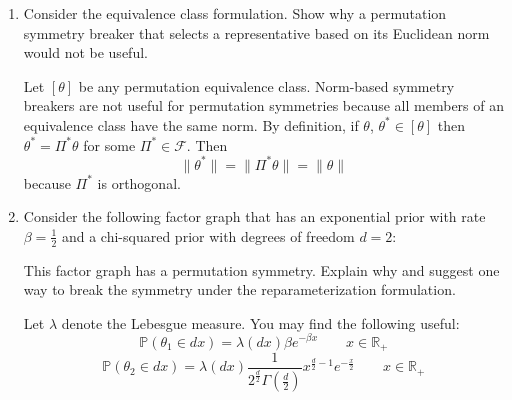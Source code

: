 \begin{enumerate}
\item
Consider the equivalence class formulation. Show why a permutation symmetry breaker that selects a representative based on its Euclidean norm would not be useful.

\begin{solution}
Let $[\theta]$ be any permutation equivalence class. Norm-based symmetry breakers are not useful for permutation symmetries because all members of an equivalence class have the same norm. By definition, if $\theta$, $\theta^*\in[\theta]$ then $\theta^*=\Pi^*\theta$ for some $\Pi^*\in\mathcal{F}$. Then
\[
\|\theta^*\| = \|\Pi^*\theta\| = \|\theta\|
\]
because $\Pi^*$ is orthogonal.
\end{solution}

\newpage

\item
Consider the following factor graph that has an exponential prior with rate $\beta = \frac{1}{2}$ and a chi-squared prior with degrees of freedom $d=2$:

\begin{figure}[h]
\begin{center}
\end{center}
\end{figure}

This factor graph has a permutation symmetry. Explain why and suggest one way to break the symmetry under the reparameterization formulation.

Let $\lambda$ denote the Lebesgue measure. You may find the following useful:
\[
\mathbb{P}(\theta_1\in dx) = \lambda(dx)\beta e^{-\beta x} \qquad x\in\mathbb{R}_+
\]
\[
\mathbb{P}(\theta_2\in dx) = \lambda(dx)\frac{1}{2^{\frac{d}{2}}\Gamma\left(\frac{d}{2}\right)}x^{\frac{d}{2}-1}e^{-\frac{x}{2}} \qquad x\in\mathbb{R}_+
\]


\end{enumerate}
